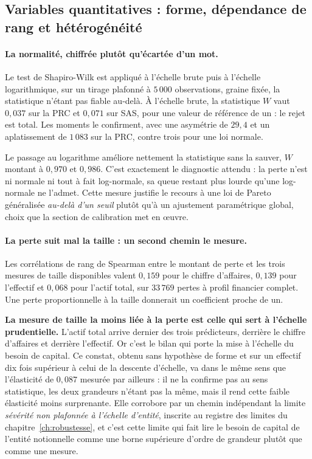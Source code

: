 \subsection{Variables quantitatives : forme, dépendance de rang et hétérogénéité}
\label{subsec:tests-quantitatifs}

\paragraph{La normalité, chiffrée plutôt qu'écartée d'un mot.} Le test de Shapiro-Wilk est
appliqué à l'échelle brute puis à l'échelle logarithmique, sur un tirage plafonné à $5\,000$
observations, graine fixée, la statistique n'étant pas fiable au-delà. À l'échelle brute, la
statistique $W$ vaut $0{,}037$ sur la PRC et $0{,}071$ sur SAS, pour une valeur de référence de
un : le rejet est total. Les moments le confirment, avec une asymétrie de $29{,}4$ et un
aplatissement de $1\,083$ sur la PRC, contre trois pour une loi normale.

Le passage au logarithme améliore nettement la statistique sans la sauver, $W$ montant à
$0{,}970$ et $0{,}986$. C'est exactement le diagnostic attendu : la perte n'est ni normale ni
tout à fait log-normale, sa queue restant plus lourde qu'une log-normale ne l'admet. Cette
mesure justifie le recours à une loi de Pareto généralisée \emph{au-delà d'un seuil} plutôt
qu'à un ajustement paramétrique global, choix que la section de calibration met en \oe uvre.

\paragraph{La perte suit mal la taille : un second chemin le mesure.} Les
corrélations de rang de Spearman entre le montant de perte et les trois mesures de taille
disponibles valent $0{,}159$ pour le chiffre d'affaires, $0{,}139$ pour l'effectif et $0{,}068$
pour l'actif total, sur $33\,769$ pertes à profil financier complet. Une perte proportionnelle à
la taille donnerait un coefficient proche de un.

\begin{attention}
\textbf{La mesure de taille la moins liée à la perte est celle qui sert à l'échelle
prudentielle.} L'actif total arrive dernier des trois prédicteurs, derrière le chiffre d'affaires
et derrière l'effectif. Or c'est le bilan qui porte la mise à l'échelle du besoin de capital. Ce
constat, obtenu sans hypothèse de forme et sur un effectif dix fois supérieur à celui de la
descente d'échelle, va dans le même sens que l'élasticité de $0{,}087$ mesurée par ailleurs : il
ne la confirme pas au sens statistique, les deux grandeurs n'étant pas la même, mais il rend
cette faible élasticité moins surprenante. Elle corrobore par un chemin indépendant la limite
\emph{sévérité non plafonnée à l'échelle d'entité}, inscrite au registre des limites du
chapitre~\ref{ch:robustesse}, et c'est cette limite qui fait lire le besoin de capital de
l'entité notionnelle comme une borne supérieure d'ordre de grandeur plutôt que comme une mesure.
\end{attention}

